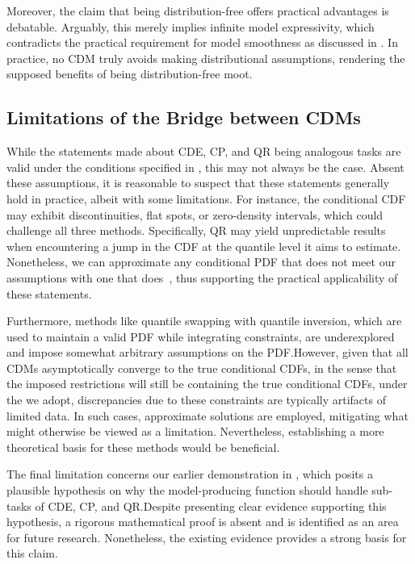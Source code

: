 Moreover, the claim that being distribution-free offers practical advantages is debatable. Arguably, this merely implies infinite model expressivity, which contradicts the practical requirement for model smoothness as discussed in . In practice, no CDM truly avoids making distributional assumptions, rendering the supposed benefits of being distribution-free moot.

\subsection{Limitations of the Bridge between CDMs}

While the statements made about CDE, CP, and QR being analogous tasks are valid under the conditions specified in , this may not always be the case. Absent these assumptions, it is reasonable to suspect that these statements generally hold in practice, albeit with some limitations. For instance, the conditional CDF may exhibit discontinuities, flat spots, or zero-density intervals, which could challenge all three methods. Specifically, QR may yield unpredictable results when encountering a jump in the CDF at the quantile level it aims to estimate. Nonetheless, we can approximate any conditional PDF that does not meet our assumptions with one that does~\cite{klenke2013probability}, thus supporting the practical applicability of these statements.

Furthermore, methods like quantile swapping with quantile inversion, which are used to maintain a valid PDF while integrating constraints, are underexplored and impose somewhat arbitrary assumptions on the PDF.\@ However, given that all CDMs asymptotically converge to the true conditional CDFs, in the sense that the imposed restrictions will still be containing the true conditional CDFs, under the  we adopt, discrepancies due to these constraints are typically artifacts of limited data. In such cases, approximate solutions are employed, mitigating what might otherwise be viewed as a limitation. Nevertheless, establishing a more theoretical basis for these methods would be beneficial.

The final limitation concerns our earlier demonstration in , which posits a plausible hypothesis on why the model-producing function should handle sub-tasks of CDE, CP, and QR.\@ Despite presenting clear evidence supporting this hypothesis, a rigorous mathematical proof is absent and is identified as an area for future research. Nonetheless, the existing evidence provides a strong basis for this claim.


